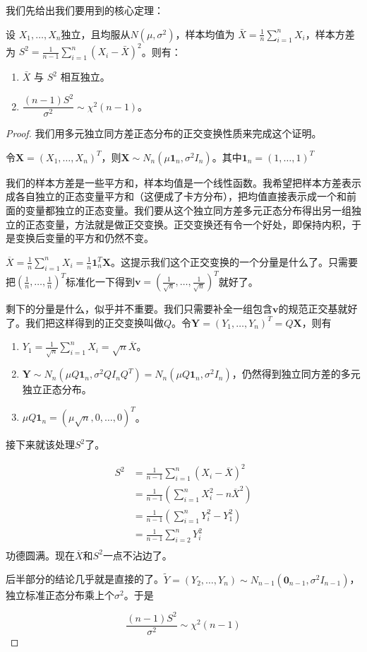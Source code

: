 我们先给出我们要用到的核心定理：
\begin{theorem}
设 $X_1, \ldots, X_n$独立，且均服从$N(\mu, \sigma^2)$，样本均值为 $\bar{X} = \frac{1}{n}\sum_{i=1}^n X_i$，样本方差为 $S^2 = \frac{1}{n-1}\sum_{i=1}^n (X_i - \bar{X})^2$。则有：

\begin{enumerate}
    \item $\bar{X}$ 与 $S^2$ 相互独立。
    \item $\dfrac{(n-1)S^2}{\sigma^2} \sim \chi^2(n-1)$。
\end{enumerate}
\end{theorem}

\begin{proof}
我们用多元独立同方差正态分布的正交变换性质来完成这个证明。

令$\mathbf{X}=(X_1,\ldots,X_n)^T$，则$\mathbf{X}\sim N_n(\mu \mathbf{1}_n,\sigma^2 I_n)$。其中$\mathbf{1}_n=(1,\ldots,1)^T$

我们的样本方差是一些平方和，样本均值是一个线性函数。我希望把样本方差表示成各自独立的正态变量平方和（这便成了卡方分布），把均值直接表示成一个和前面的变量都独立的正态变量。我们要从这个独立同方差多元正态分布得出另一组独立的正态变量，方法就是做正交变换。正交变换还有令一个好处，即保持内积，于是变换后变量的平方和仍然不变。

$\overline{X}=\frac1n \sum_{i=1}^n X_i=\frac{1}{n}\mathbf{1}_n^T\mathbf{X}$。这提示我们这个正交变换的一个分量是什么了。只需要把$(\frac1n,\ldots,\frac{1}{n})^T$标准化一下得到$\mathbf{v}=(\frac{1}{\sqrt{n}},\ldots,\frac{1}{\sqrt{n}})^T$就好了。

剩下的分量是什么，似乎并不重要。我们只需要补全一组包含$\mathbf{v}$的规范正交基就好了。我们把这样得到的正交变换叫做$Q$。令$\mathbf{Y}=(Y_1,\ldots,Y_n)^T=Q\mathbf{X}$，则有
\begin{enumerate}
    \item $Y_1=\frac{1}{\sqrt{n}}\sum_{i=1}^n X_i = \sqrt{n}\overline{X}$。
    \item $\mathbf{Y}\sim N_n(\mu Q\mathbf{1}_n,\sigma^2 QI_nQ^T)=N_n(\mu Q\mathbf{1}_n,\sigma^2 I_n)$，仍然得到独立同方差的多元独立正态分布。
    \item $\mu Q\mathbf{1}_n=(\mu\sqrt{n},0,\ldots,0)^T$。
\end{enumerate}

接下来就该处理$S^2$了。

\begin{align*}
S^2&=\frac{1}{n-1}\sum_{i=1}^n(X_i-\overline{X})^2 \\
&= \frac{1}{n-1}\left(\sum_{i=1}^nX_i^2 - n\overline{X}^2\right)\\
&= \frac{1}{n-1}\left(\sum_{i=1}^nY_i^2 - Y_1^2\right)\\
&= \frac{1}{n-1}\sum_{i=2}^nY_i^2\\
\end{align*}
功德圆满。现在$\overline{X}$和$S^2$一点不沾边了。

后半部分的结论几乎就是直接的了。$\tilde{Y}=(Y_2,\ldots,Y_n)\sim N_{n-1}(\mathbf{0}_{n-1},\sigma^2 I_{n-1})$，独立标准正态分布乘上个$\sigma^2$。于是

\[
\dfrac{(n-1)S^2}{\sigma^2}\sim \chi^2(n-1)
\]
\end{proof}

